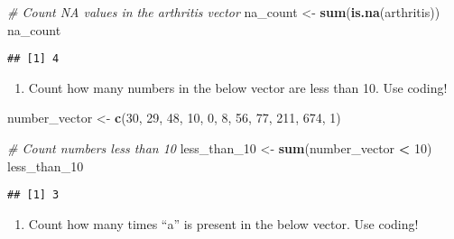 \documentclass[
]{article}
\newenvironment{Shaded}{\begin{snugshade}}{\end{snugshade}}
\newcommand{\CommentTok}[1]{\textcolor[rgb]{0.56,0.35,0.01}{\textit{#1}}}
\newcommand{\DecValTok}[1]{\textcolor[rgb]{0.00,0.00,0.81}{#1}}
\newcommand{\FunctionTok}[1]{\textcolor[rgb]{0.13,0.29,0.53}{\textbf{#1}}}
\newcommand{\NormalTok}[1]{#1}
\newcommand{\OtherTok}[1]{\textcolor[rgb]{0.56,0.35,0.01}{#1}}
\newcommand{\SpecialCharTok}[1]{\textcolor[rgb]{0.81,0.36,0.00}{\textbf{#1}}}
\providecommand{\tightlist}{%
  \setlength{\itemsep}{0pt}\setlength{\parskip}{0pt}}
\begin{document}
\begin{Shaded}
\begin{Highlighting}[]
\CommentTok{\# Count NA values in the arthritis vector}
\NormalTok{na\_count }\OtherTok{\textless{}{-}} \FunctionTok{sum}\NormalTok{(}\FunctionTok{is.na}\NormalTok{(arthritis))}
\NormalTok{na\_count}
\end{Highlighting}
\end{Shaded}

\begin{verbatim}
## [1] 4
\end{verbatim}

\begin{enumerate}
\def\labelenumi{\arabic{enumi})}
\setcounter{enumi}{5}
\tightlist
\item
  Count how many numbers in the below vector are less than 10. Use
  coding!
\end{enumerate}

\begin{Shaded}
\begin{Highlighting}[]
\NormalTok{number\_vector }\OtherTok{\textless{}{-}} \FunctionTok{c}\NormalTok{(}\DecValTok{30}\NormalTok{, }\DecValTok{29}\NormalTok{, }\DecValTok{48}\NormalTok{, }\DecValTok{10}\NormalTok{, }\DecValTok{0}\NormalTok{, }\DecValTok{8}\NormalTok{, }\DecValTok{56}\NormalTok{, }\DecValTok{77}\NormalTok{, }\DecValTok{211}\NormalTok{, }\DecValTok{674}\NormalTok{, }\DecValTok{1}\NormalTok{)}

\CommentTok{\# Count numbers less than 10}
\NormalTok{less\_than\_10 }\OtherTok{\textless{}{-}} \FunctionTok{sum}\NormalTok{(number\_vector }\SpecialCharTok{\textless{}} \DecValTok{10}\NormalTok{)}
\NormalTok{less\_than\_10}
\end{Highlighting}
\end{Shaded}

\begin{verbatim}
## [1] 3
\end{verbatim}

\begin{enumerate}
\def\labelenumi{\arabic{enumi})}
\setcounter{enumi}{6}
\tightlist
\item
  Count how many times ``a'' is present in the below vector. Use coding!
\end{enumerate}
\end{document}
